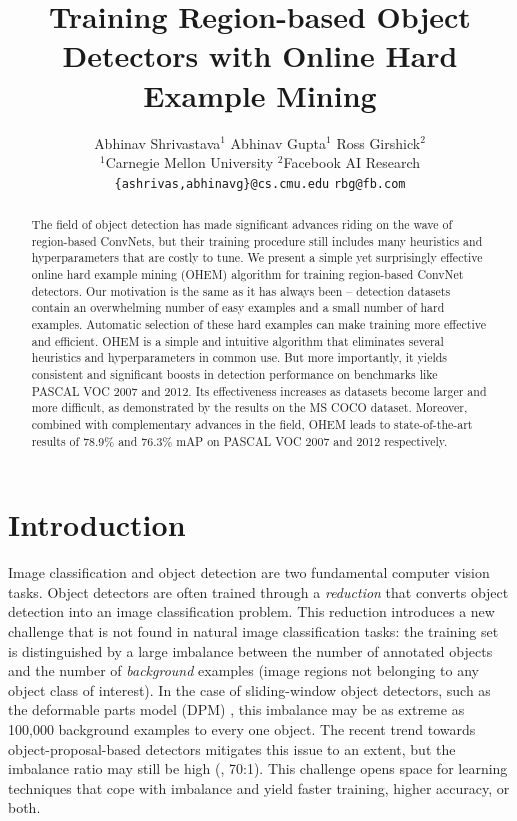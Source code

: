 \documentclass[10pt,twocolumn,letterpaper]{article}
\begin{document}
\title{Training Region-based Object Detectors with Online Hard Example Mining}
\author{
Abhinav Shrivastava$^1$ \qquad
Abhinav Gupta$^1$ \qquad
Ross Girshick$^2$ \\
$^1$Carnegie Mellon University \qquad
$^2$Facebook AI Research\\
{\tt\small \{ashrivas,abhinavg\}@cs.cmu.edu} \qquad
{\tt\small rbg@fb.com}
}
\maketitle

\begin{abstract}
The field of object detection has made significant advances riding on the wave of region-based ConvNets, but their training procedure still includes many heuristics and hyperparameters that are costly to tune. We present a simple yet surprisingly effective online hard example mining (OHEM) algorithm for training region-based ConvNet detectors. Our motivation is the same as it has always been -- detection datasets contain an overwhelming number of easy examples and a small number of hard examples. Automatic selection of these hard examples can make training more effective and efficient. OHEM is a simple and intuitive algorithm that eliminates several heuristics and hyperparameters in common use. But more importantly, it yields consistent and significant boosts in detection performance on benchmarks like PASCAL VOC 2007 and 2012. Its effectiveness increases as datasets become larger and more difficult, as demonstrated by the results on the MS COCO dataset. Moreover, combined with complementary advances in the field, OHEM leads to state-of-the-art results of 78.9\% and 76.3\% mAP on PASCAL VOC 2007 and 2012 respectively.
\end{abstract}

\vspace{-0.15in}

\section{Introduction}\label{sec:intro}
Image classification and object detection are two fundamental computer vision tasks.
Object detectors are often trained through a \emph{reduction} that converts object detection into an image classification problem. This reduction introduces a new challenge that is not found in natural image classification tasks: the training set is distinguished by a large imbalance between the number of annotated objects and the number of \emph{background} examples (image regions not belonging to any object class of interest). In the case of sliding-window object detectors, such as the deformable parts model (DPM) \cite{dpm}, this imbalance may be as extreme as 100,000 background examples to every one object. The recent trend towards object-proposal-based detectors \cite{Uijlings13,rcnn} mitigates this issue to an extent, but the imbalance ratio may still be high (\eg, 70:1). This challenge opens space for learning techniques that cope with imbalance and yield faster training, higher accuracy, or both.
\end{document}
